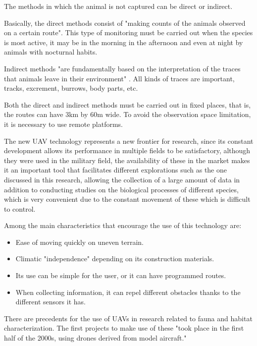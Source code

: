 \documentclass[10pt,english, openany]{book}
\begin{document}
The methods in which the animal is not captured can be direct or indirect.

Basically, the direct methods consist of "making counts of the animals observed on a certain route".\cite{Arevalo2001} This type of monitoring must be carried out when the species is most active, it may be in the morning in the afternoon and even at night by animals with nocturnal habits.

Indirect methods "are fundamentally based on the interpretation of the traces that animals leave in their environment" \cite{Arevalo2001}. All kinds of traces are important, tracks, excrement, burrows, body parts, etc.

Both the direct and indirect methods must be carried out in fixed places, that is, the routes can have 3km by 60m wide. To avoid the observation space limitation, it is necessary to use remote platforms.

The new UAV technology represents a new frontier for research, since its constant development allows its performance in multiple fields to be satisfactory, although they were used in the military field, the availability of these in the market makes it an important tool that facilitates different explorations such as the one discussed in this research, allowing the collection of a large amount of data in addition to conducting studies on the biological processes of different species, which is very convenient due to the constant movement of these which is difficult to control.

Among the main characteristics that encourage the use of this technology are:

\begin{itemize}
    \item Ease of moving quickly on uneven terrain.
    \item Climatic "independence" depending on its construction materials.
    \item Its use can be simple for the user, or it can have programmed routes.
    \item When collecting information, it can repel different obstacles thanks to the different sensors it has.
    \cite{Ecol2018}
\end{itemize}

There are precedents for the use of UAVs in research related to fauna and habitat characterization. The first projects to make use of these "took place in the first half of the 2000s, using drones derived from model aircraft." \cite{Productividad2017}
\end{document}

